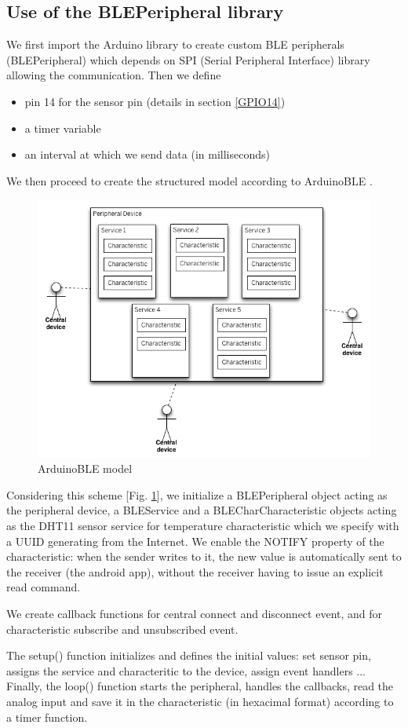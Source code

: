 \subsection{Use of the BLEPeripheral library}
We first import the Arduino library to create custom BLE peripherals (BLEPeripheral) which depends on SPI (Serial Peripheral Interface) library allowing the communication.
Then we define 
\begin{itemize}
    \item pin 14 for the sensor pin (details in section \ref{GPIO14})
    \item a timer variable
    \item an interval at which we send data (in milliseconds)
\end{itemize}
We then proceed to create the structured model according to ArduinoBLE \cite{b3}.
\begin{figure}[!htb]%
    \centering
    \includegraphics[scale=0.2]{images/ble-bulletin-board-model.png}%
    \caption{ArduinoBLE model}%
    \label{fig:ArduinoBLE}%
\end{figure}
Considering this scheme [Fig. \ref{fig:ArduinoBLE}], we initialize a BLEPeripheral object acting as the peripheral device, a BLEService and a BLECharCharacteristic objects acting as the DHT11 sensor service for temperature characteristic which we specify with a UUID generating from the Internet.
We enable the NOTIFY property of the characteristic: when the sender writes to it, the new value is automatically sent to the receiver (the android app), without the receiver having to issue an explicit read command.

We create callback functions for central connect and disconnect event, and for characteristic subscribe and unsubscribed event.

The setup() function initializes and defines the initial values: set sensor pin, assigns the service and characteritic to the device, assign event handlers ...
Finally, the loop() function starts the peripheral, handles the callbacks, read the analog input and save it in the characteristic (in hexacimal format) according to a timer function.
